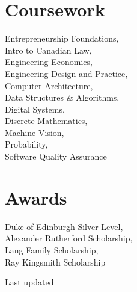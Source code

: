 \documentclass[]{hieudo-build}
\begin{document}
\begin{minipage}[t]{0.3\textwidth}
\sectionsep



\section{Coursework}
Entrepreneurship Foundations,\\
Intro to Canadian Law,\\
Engineering Economics,\\
Engineering Design and Practice,\\
Computer Architecture, \\
Data Structures \& Algorithms,\\
Digital Systems,\\
Discrete Mathematics, \\
Machine Vision,\\
Probability,\\
Software Quality Assurance\\
\sectionsep

\section{Awards}
Duke of Edinburgh Silver Level,\\
Alexander Rutherford Scholarship, \\
Lang Family Scholarship, \\
Ray Kingsmith Scholarship \\
\sectionsep

\sectionsep
{}
Last updated 

%
%
\end{minipage} 
\end{document}
